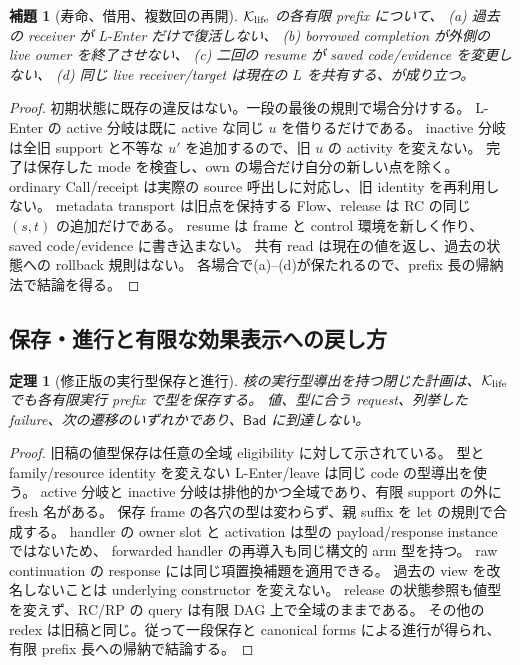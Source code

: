 \documentclass[11pt,a4paper]{article}
\newtheorem{lemma}[definition]{補題}
\newtheorem{theorem}[definition]{定理}
\newcommand{\Bad}{\mathsf{Bad}}
\newcommand{\Core}{\mathcal K}
\begin{document}
\begin{lemma}[寿命、借用、複数回の再開]
\label{lem:life}
\(\Core_{\rm life}\) の各有限 prefix について、
(a) 過去の receiver が L-Enter だけで復活しない、
(b) borrowed completion が外側の live owner を終了させない、
(c) 二回の resume が saved code/evidence を変更しない、
(d) 同じ live receiver/target は現在の \(L\) を共有する、が成り立つ。
\end{lemma}
\begin{proof}
初期状態に既存の違反はない。一段の最後の規則で場合分けする。
L-Enter の active 分岐は既に active な同じ \(u\) を借りるだけである。
inactive 分岐は全旧 support と不等な \(u'\) を追加するので、旧 \(u\) の activity を変えない。
完了は保存した mode を検査し、own の場合だけ自分の新しい点を除く。
ordinary Call/receipt は実際の source 呼出しに対応し、旧 identity を再利用しない。
metadata transport は旧点を保持する Flow、release は RC の同じ \((s,t)\) の追加だけである。
resume は frame と control 環境を新しく作り、saved code/evidence に書き込まない。
共有 read は現在の値を返し、過去の状態への rollback 規則はない。
各場合で(a)--(d)が保たれるので、prefix 長の帰納法で結論を得る。
\end{proof}

\subsection{保存・進行と有限な効果表示への戻し方}

\begin{theorem}[修正版の実行型保存と進行]
\label{thm:life-value}
核の実行型導出を持つ閉じた計画は、\(\Core_{\rm life}\) でも各有限実行 prefix で型を保存する。
値、型に合う request、列挙した failure、次の遷移のいずれかであり、\(\Bad\) に到達しない。
\end{theorem}
\begin{proof}
旧稿の値型保存は任意の全域 eligibility に対して示されている。
型と family/resource identity を変えない L-Enter/leave は同じ code の型導出を使う。
active 分岐と inactive 分岐は排他的かつ全域であり、有限 support の外に fresh 名がある。
保存 frame の各穴の型は変わらず、親 suffix を let の規則で合成する。
handler の owner slot と activation は型の payload/response instance ではないため、
forwarded handler の再導入も同じ構文的 arm 型を持つ。
raw continuation の response には同じ項置換補題を適用できる。
過去の view を改名しないことは underlying constructor を変えない。
release の状態参照も値型を変えず、RC/RP の query は有限 DAG 上で全域のままである。
その他の redex は旧稿と同じ。従って一段保存と canonical forms による進行が得られ、
有限 prefix 長への帰納で結論する。
\end{proof}
\end{document}
